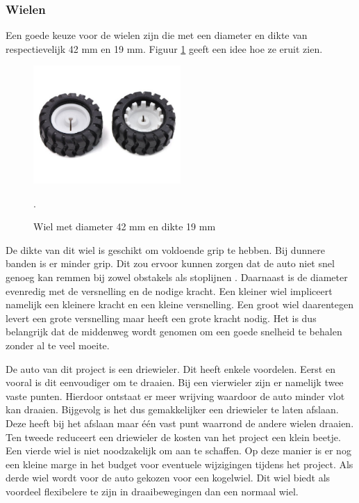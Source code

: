 \documentclass[a4paper,twoside,kulak]{kulakreport} %
\begin{document}
\subsubsection{Wielen}
Een goede keuze voor de wielen zijn die met een diameter en dikte van respectievelijk 42 mm en 19 mm.
Figuur \ref{fig:wiel} geeft een idee hoe ze eruit zien.

\begin{figure}
	\includegraphics[width=0.5\textwidth]{wielen}
	\centering
	\caption{Wiel met diameter 42 mm en dikte 19 mm} 
	\cite{Wiel42x19mm}.
	\label{fig:wiel}
\end{figure}

De dikte van dit wiel is geschikt om voldoende grip te hebben. Bij dunnere banden is er minder grip. Dit zou ervoor kunnen zorgen dat de auto niet snel genoeg kan remmen bij zowel obstakels als stoplijnen \cite{Banden}. 
Daarnaast is de diameter evenredig met de versnelling en de nodige kracht. Een kleiner wiel impliceert namelijk een kleinere kracht en een kleine versnelling. Een groot wiel daarentegen levert een grote versnelling maar heeft een grote kracht nodig. Het is dus belangrijk dat de middenweg wordt genomen om een goede snelheid te behalen zonder al te veel moeite.  

De auto van dit project is een driewieler. Dit heeft enkele voordelen. Eerst en vooral is dit eenvoudiger om te draaien. Bij een vierwieler zijn er namelijk twee vaste punten. Hierdoor ontstaat er meer wrijving waardoor de auto minder vlot kan draaien. Bijgevolg is het dus gemakkelijker een driewieler te laten afslaan. Deze heeft bij het afslaan maar één vast punt waarrond de andere wielen draaien.
Ten tweede reduceert een driewieler de kosten van het project een klein beetje. Een vierde wiel is niet noodzakelijk om aan te schaffen. Op deze manier is er nog een kleine marge in het budget voor eventuele wijzigingen tijdens het project. Als derde wiel wordt voor de auto gekozen voor een kogelwiel. Dit wiel biedt als voordeel flexibelere te zijn in draaibewegingen dan een normaal wiel. 
\label{Wielen}
\end{document}
